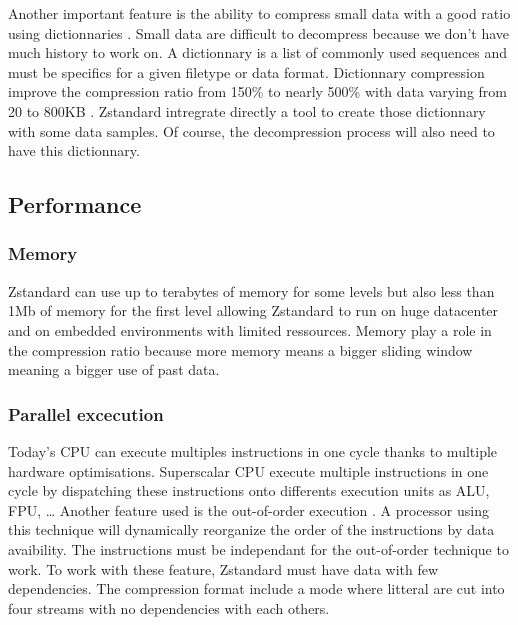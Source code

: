 \documentclass{sig-alternate-05-2015}
\begin{document}
    Another important feature is the ability to compress small data with a good ratio using
    dictionnaries \cite{dictionnary}. Small data are difficult to decompress because we don't have
    much history to work on. A dictionnary is a list of commonly used sequences and must be
    specifics for a given filetype or data format. Dictionnary compression improve the compression
    ratio from 150\% to nearly 500\% with data varying from 20 to 800KB \cite{dictionnary}.
    Zstandard intregrate directly a tool to create those dictionnary with some data samples. Of
    course, the decompression process will also need to have this dictionnary.

    \subsection{Performance}\label{sec:perf}
    \subsubsection{Memory}
        Zstandard can use up to terabytes of memory for some levels but also less than 1Mb of memory
        for the first level \cite{presentation} allowing Zstandard to run on huge datacenter and on
        embedded environments with limited ressources. Memory play a role in the compression ratio
        because more memory means a bigger sliding window meaning a bigger use of past data.

    \subsubsection{Parallel excecution}
        Today's CPU can execute multiples instructions in one cycle thanks to multiple hardware
        optimisations. Superscalar CPU \cite{superscalar} execute multiple instructions in one cycle
        by dispatching these instructions onto differents execution units as ALU, FPU, \ldots{}
        Another feature used is the out-of-order execution \cite{outoforder}. A processor using this
        technique will dynamically reorganize the order of the instructions by data avaibility. The
        instructions must be independant for the out-of-order technique to work. To work with these
        feature, Zstandard must have data with few dependencies. The compression format include a
        mode where litteral are cut into four streams with no dependencies with each others.
\end{document}
